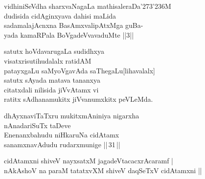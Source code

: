 \begin{entry}
\begin{shl}
vidhiniSeVdha sharxvaNagaLa mathisaleraDa\char'273\char'236M\\
dudisida cidAginxyava dahisi maLida\\
sadamalajAcnxna BasAmxvalipAtxMga guBa-\\
yada kamaRPala BoVgadeVvavaduMte ||3||
\end{shl}
\end{entry}

\begin{entry}
\gl{}
\begin{shl}
satutx hoVdavarugaLa sudidhxya\\
visatxrisutihudalalx ratidAM\\
patayxgaLu saMyoVgavAda saThegaLu[lihavalalx]\\
satutx sAyada matava tananxya\\
citatxdali nilisida jiVvAtamx vi\\
ratitx sAdhanamukitx jiVvanumxkitx peVLeMda.
\end{shl}
\begin{shl}
dhAyxnaviTaTxru mukitxmAniniya nigarxha\\nAnadariSuTx
taDeve\\ Enenanxbahudu niHkaruNa cidAtamx\\ sanamxnavAdudu
rudarxmunige ||\,31\,|| 
\end{shl}
\end{entry}

\begin{entry}
\begin{shl}
cidAtamxni shiveV nayxsatxM jagadeVtacacxrAcaramf |\\
nAkAshoV na paraM tatatxvXM shiveV daqSeTxV cidAtamxni ||
\end{shl}
\end{entry}

